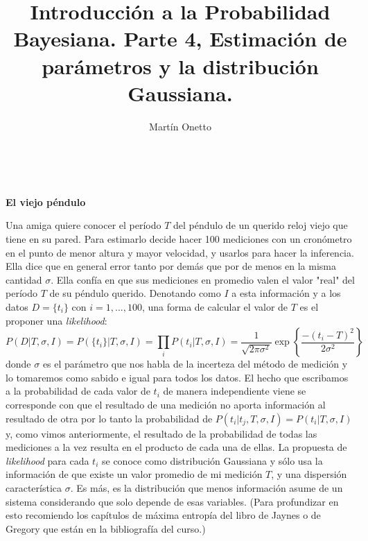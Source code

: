 \documentclass[aps,onecolumn,12pt,notitlepage]{revtex4-1}
\begin{document}
\renewcommand{\andname}{y}
\renewcommand{\tablename}{Tabla}
\renewcommand{\labelenumi}{\Roman{enumi}.}

\title{Introducción a la Probabilidad Bayesiana.  Parte 4, Estimación de parámetros y la distribución Gaussiana.}
\author{Martín Onetto} 
\maketitle
\

\textbf{El viejo péndulo}

Una amiga quiere conocer el período $T$ del péndulo de un querido reloj viejo que tiene en su pared. Para estimarlo decide hacer 100 mediciones con un cronómetro en el punto de menor altura  y mayor velocidad, y usarlos para hacer la inferencia. Ella dice que en general error tanto por demás que por de menos en la misma cantidad $\sigma$. Ella confía en que sus mediciones en promedio valen el valor "real" del período $T$ de su péndulo querido. Denotando como $I$ a esta información y a los datos $D =\{t_{i}\}$ con $i =1,...,100$, una forma de calcular el valor de $T$ es el proponer una \textit{likelihood}:
\begin{equation}
{\displaystyle P(D|T,\sigma,I) =  P(\{ t_{i} \}|T,\sigma,I) = \prod_{i} P(t_{i}|T,\sigma,I) = \frac{1}{\sqrt{2\pi \sigma^2} } \exp\left\{\frac{-(t_{i}-T)^2}{2\sigma^2}\right\}}
\end{equation}
donde $\sigma$ es el parámetro que nos habla de la incerteza del método de medición y lo tomaremos como sabido e igual para todos los datos. El hecho que escribamos a la probabilidad de cada valor de $t_{i}$ de manera independiente viene se corresponde con que el resultado de una medición no aporta información al resultado de otra por lo tanto la probabilidad de $P(t_{i}|t_{j},T,\sigma,I) = P(t_{i}|T,\sigma,I)$ y, como vimos anteriormente, el resultado de la probabilidad de todas las mediciones a la vez resulta en el producto de cada una de ellas. 
La propuesta de \textit{likelihood} para cada $t_{i}$ se conoce como distribución Gaussiana y sólo usa la información de que existe un valor promedio de mi medición $T$, y una dispersión característica $\sigma$. Es más, es la distribución que menos información asume de un sistema considerando que solo depende de esas variables. (Para profundizar en esto recomiendo los capítulos de máxima entropía del libro de Jaynes o de Gregory que están en la bibliografía del curso.)
\end{document}
